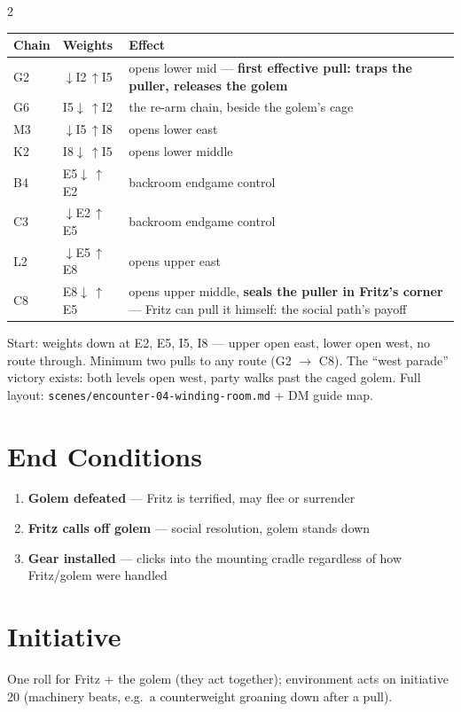 \documentclass[10pt,letterpaper]{article}
\begin{document}
\begin{multicols}{2}
\begin{tabularx}{\columnwidth}{@{}llX@{}}
\toprule
\textbf{Chain} & \textbf{Weights} & \textbf{Effect} \\
\midrule
G2 & $\downarrow$I2\,$\uparrow$I5 & opens lower mid --- \textbf{first effective pull: traps the puller, releases the golem} \\
G6 & I5$\downarrow$\,$\uparrow$I2 & the re-arm chain, beside the golem's cage \\
M3 & $\downarrow$I5\,$\uparrow$I8 & opens lower east \\
K2 & I8$\downarrow$\,$\uparrow$I5 & opens lower middle \\
B4 & E5$\downarrow$\,$\uparrow$E2 & backroom endgame control \\
C3 & $\downarrow$E2\,$\uparrow$E5 & backroom endgame control \\
L2 & $\downarrow$E5\,$\uparrow$E8 & opens upper east \\
C8 & E8$\downarrow$\,$\uparrow$E5 & opens upper middle, \textbf{seals the puller in Fritz's corner} --- Fritz can pull it himself: the social path's payoff \\
\bottomrule
\end{tabularx}

\vspace{4pt}
Start: weights down at E2, E5, I5, I8 --- upper open east, lower open west, no route through. Minimum two pulls to any route (G2 $\to$ C8). The ``west parade'' victory exists: both levels open west, party walks past the caged golem. Full layout: \texttt{scenes/encounter-04-winding-room.md} + DM guide map.

\section*{End Conditions}
\begin{enumerate}
\item \textbf{Golem defeated} --- Fritz is terrified, may flee or surrender
\item \textbf{Fritz calls off golem} --- social resolution, golem stands down
\item \textbf{Gear installed} --- clicks into the mounting cradle regardless of how Fritz/golem were handled
\end{enumerate}

\section*{Initiative}
One roll for Fritz + the golem (they act together); environment acts on initiative 20 (machinery beats, e.g.\ a counterweight groaning down after a pull).


\end{multicols}
\end{document}
